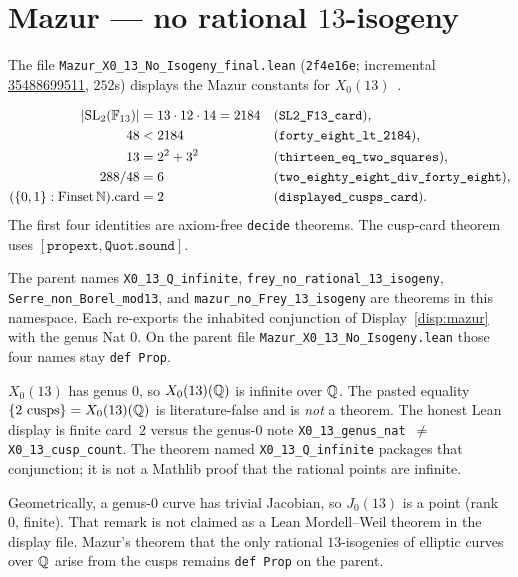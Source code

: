 \section{Mazur --- no rational $13$-isogeny}\label{sec:mazur}

The file
\texttt{Mazur\_X0\_13\_No\_Isogeny\_final.lean}
(\texttt{2f4e16e}; incremental
\href{https://github.com/DavidFox998/beal-level-26-foundations/actions/runs/35488699511}{35488699511},
$252$s) displays the Mazur constants for $X_0(13)$~\cite{mazur1978}.

\begin{displaythm}
\label{disp:mazur}
\[
\begin{aligned}
  \lvert\mathrm{SL}_2(\mathbb{F}_{13})\rvert&=13\cdot 12\cdot 14=2184
    &&(\texttt{SL2\_F13\_card}),\\
  48&<2184
    &&(\texttt{forty\_eight\_lt\_2184}),\\
  13&=2^2+3^2
    &&(\texttt{thirteen\_eq\_two\_squares}),\\
  288/48&=6
    &&(\texttt{two\_eighty\_eight\_div\_forty\_eight}),\\
  (\{0,1\}:\mathrm{Finset}\,\mathbb{N}).\mathrm{card}&=2
    &&(\texttt{displayed\_cusps\_card}).
\end{aligned}
\]
The first four identities are axiom-free \texttt{decide} theorems.
The cusp-card theorem uses $[\mathtt{propext},\mathtt{Quot.sound}]$.
\end{displaythm}

The parent names \texttt{X0\_13\_Q\_infinite},
\texttt{frey\_no\_rational\_13\_isogeny},
\texttt{Serre\_non\_Borel\_mod13}, and
\texttt{mazur\_no\_Frey\_13\_isogeny} are theorems in this
namespace. Each re-exports the inhabited conjunction of
Display~\ref{disp:mazur} with the genus Nat $0$. On the parent
file \texttt{Mazur\_X0\_13\_No\_Isogeny.lean} those four names stay
\texttt{def Prop}.

\begin{honesty}
$X_0(13)$ has genus $0$, so $X_0(13)(\mathbb{Q})$ is infinite over $\mathbb{Q}$.
The pasted equality $\{2\text{ cusps}\}=X_0(13)(\mathbb{Q})$ is
literature-false and is \emph{not} a theorem. The honest Lean
display is finite card~$2$ versus the genus-$0$ note
\texttt{X0\_13\_genus\_nat $\neq$ X0\_13\_cusp\_count}. The theorem
named \texttt{X0\_13\_Q\_infinite} packages that conjunction; it is
not a Mathlib proof that the rational points are infinite.
\end{honesty}

Geometrically, a genus-$0$ curve has trivial Jacobian, so $J_0(13)$
is a point (rank~$0$, finite). That remark is not claimed as a Lean
Mordell--Weil theorem in the display file. Mazur's theorem that the
only rational $13$-isogenies of elliptic curves over $\mathbb{Q}$ arise from
the cusps remains \texttt{def Prop} on the parent.

